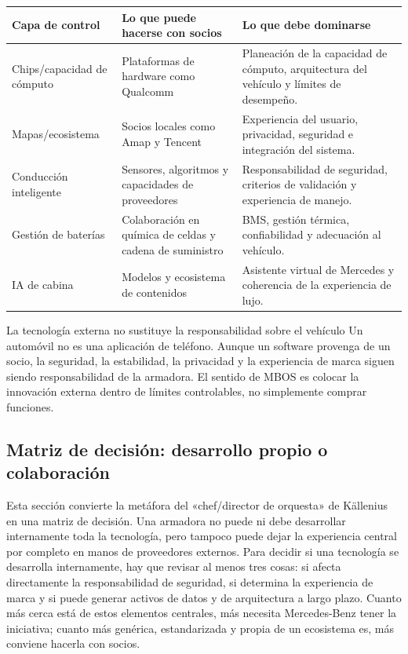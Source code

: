\noindent\begin{tabularx}{\textwidth}{p{}p{}X}
\toprule
Capa de control & Lo que puede hacerse con socios & Lo que debe dominarse \\
\midrule
Chips/capacidad de cómputo & Plataformas de hardware como Qualcomm & Planeación de la capacidad de cómputo, arquitectura del vehículo y límites de desempeño. \\
Mapas/ecosistema & Socios locales como Amap y Tencent & Experiencia del usuario, privacidad, seguridad e integración del sistema. \\
Conducción inteligente & Sensores, algoritmos y capacidades de proveedores & Responsabilidad de seguridad, criterios de validación y experiencia de manejo. \\
Gestión de baterías & Colaboración en química de celdas y cadena de suministro & BMS, gestión térmica, confiabilidad y adecuación al vehículo. \\
IA de cabina & Modelos y ecosistema de contenidos & Asistente virtual de Mercedes y coherencia de la experiencia de lujo. \\
\bottomrule
\end{tabularx}

\begin{warningbox}{La tecnología externa no sustituye la responsabilidad sobre el vehículo}
Un automóvil no es una aplicación de teléfono. Aunque un software provenga de un socio, la seguridad, la estabilidad, la privacidad y la experiencia de marca siguen siendo responsabilidad de la armadora. El sentido de MBOS es colocar la innovación externa dentro de límites controlables, no simplemente comprar funciones.
\end{warningbox}

\subsection{Matriz de decisión: desarrollo propio o colaboración}

Esta sección convierte la metáfora del «chef/director de orquesta» de Källenius en una matriz de decisión. Una armadora no puede ni debe desarrollar internamente toda la tecnología, pero tampoco puede dejar la experiencia central por completo en manos de proveedores externos. Para decidir si una tecnología se desarrolla internamente, hay que revisar al menos tres cosas: si afecta directamente la responsabilidad de seguridad, si determina la experiencia de marca y si puede generar activos de datos y de arquitectura a largo plazo. Cuanto más cerca está de estos elementos centrales, más necesita Mercedes-Benz tener la iniciativa; cuanto más genérica, estandarizada y propia de un ecosistema es, más conviene hacerla con socios.

